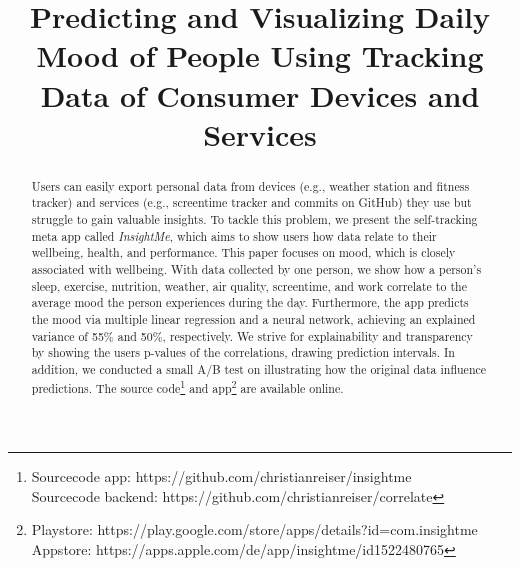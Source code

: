 \documentclass[conference]{IEEEtran}
\begin{document}
\title{Predicting and Visualizing Daily Mood of People Using Tracking Data of Consumer Devices and Services\\
}

\author{






}

\maketitle

\begin{abstract}
Users can easily export personal data from devices (e.g., weather station and fitness tracker) and services (e.g., screentime tracker and commits on GitHub) they use but struggle to gain valuable insights. To tackle this problem, we present the self-tracking meta app called \textit{InsightMe}, which aims to show users how data relate to their wellbeing, health, and performance. This paper focuses on mood, which is closely associated with wellbeing. With data collected by one person, we show how a person's sleep, exercise, nutrition, weather, air quality, screentime, and work correlate to the average mood the person experiences during the day. Furthermore, the app predicts the mood via multiple linear regression and a neural network, achieving an explained variance of 55\% and 50\%, respectively. 
We strive for explainability and transparency by showing the users p-values of the correlations, drawing prediction intervals. In addition, we conducted a small A/B test on illustrating how the original data influence predictions. The source code\footnote{Sourcecode app: https://github.com/christianreiser/insightme\\
Sourcecode backend: https://github.com/christianreiser/correlate}
and app\footnote{Playstore: https://play.google.com/store/apps/details?id=com.insightme\\
Appstore: https://apps.apple.com/de/app/insightme/id1522480765}
are available online.
\end{abstract}
\end{document}
